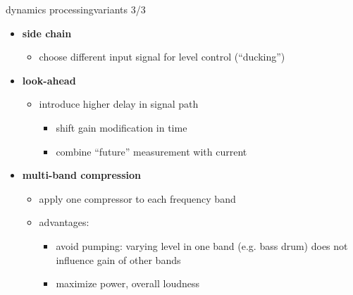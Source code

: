 \begin{frame}{dynamics processing}{variants 3/3}
	\begin{itemize}
		\item	\textbf{side chain}
			\begin{itemize}
				\item	choose different input signal for level control (``ducking'')
			\end{itemize}
		\pause
        \bigskip
		\item	\textbf{look-ahead}
			\begin{itemize}
				\item	introduce higher delay in signal path
					\begin{itemize}
						\item	shift gain modification in time
						\item	combine ``future'' measurement with current
					\end{itemize}
			\end{itemize}
        \bigskip
		\pause
		\item	\textbf{multi-band compression}
            \begin{itemize}
                \item	apply one compressor to each frequency band
                \item	advantages:
                    \begin{itemize}
                        \item	avoid pumping: varying level in one band (e.g. bass drum) does not influence gain of other bands
                        \item	maximize power, overall loudness
                    \end{itemize}
            \end{itemize}
        
	\end{itemize}
\end{frame}

